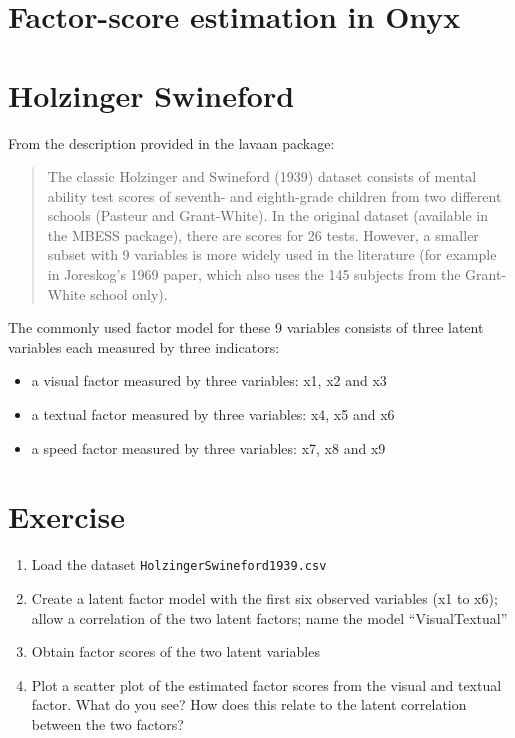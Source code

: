 \documentclass[
  letterpaper,
  DIV=11,
  numbers=noendperiod]{scrreprt}
\begin{document}
\section{Factor-score estimation in
Onyx}\label{factor-score-estimation-in-onyx}

\section{Holzinger Swineford}\label{holzinger-swineford-1}

From the description provided in the lavaan package:

\begin{quote}
The classic Holzinger and Swineford (1939) dataset consists of mental
ability test scores of seventh- and eighth-grade children from two
different schools (Pasteur and Grant-White). In the original dataset
(available in the MBESS package), there are scores for 26 tests.
However, a smaller subset with 9 variables is more widely used in the
literature (for example in Joreskog's 1969 paper, which also uses the
145 subjects from the Grant-White school only).
\end{quote}

The commonly used factor model for these 9 variables consists of three
latent variables each measured by three indicators:

\begin{itemize}
\item
  a visual factor measured by three variables: x1, x2 and x3
\item
  a textual factor measured by three variables: x4, x5 and x6
\item
  a speed factor measured by three variables: x7, x8 and x9
\end{itemize}

\section{Exercise}\label{exercise-3}

\begin{enumerate}
\def\labelenumi{\arabic{enumi}.}
\item
  Load the dataset \texttt{HolzingerSwineford1939.csv}
\item
  Create a latent factor model with the first six observed variables (x1
  to x6); allow a correlation of the two latent factors; name the model
  ``VisualTextual''
\item
  Obtain factor scores of the two latent variables
\item
  Plot a scatter plot of the estimated factor scores from the visual and
  textual factor. What do you see? How does this relate to the latent
  correlation between the two factors?
\end{enumerate}
\end{document}
